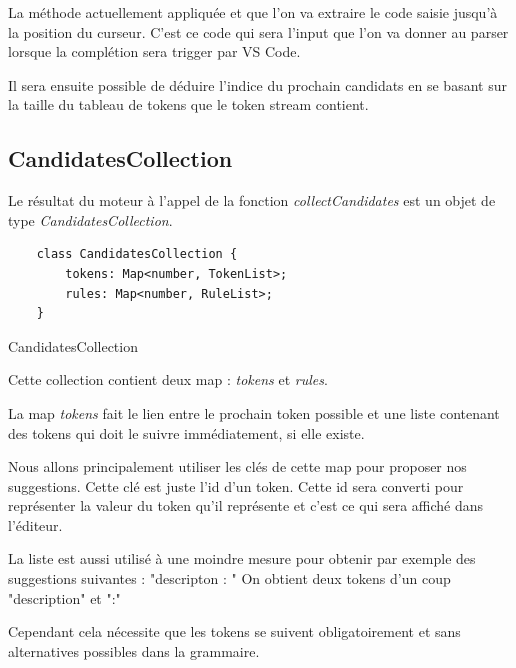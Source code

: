 \documentclass[
    iict, %
    il, %
]{heig-tb}
\begin{document}
La méthode actuellement appliquée et que l'on va extraire le code saisie jusqu'à la position du curseur.
C'est ce code qui sera l'input que l'on va donner au parser lorsque la complétion sera trigger par VS Code.

Il sera ensuite possible de déduire l'indice du prochain candidats en se basant sur la taille du tableau de tokens que le token stream contient.


\subsection{CandidatesCollection}

Le résultat du moteur à l'appel de la fonction \emph{collectCandidates} est un objet de type \emph{CandidatesCollection}.

\begin{listing}[!ht]
    \begin{verbatim}
    class CandidatesCollection {
        tokens: Map<number, TokenList>;
        rules: Map<number, RuleList>;
    }
    \end{verbatim}
    \caption{CandidatesCollection}
    \label{CandidatesCollection}
\end{listing}

Cette collection contient deux map : \emph{tokens} et \emph{rules}.

La map \emph{tokens} fait le lien entre le prochain token possible et une liste contenant des tokens qui doit le suivre immédiatement, si elle existe.

Nous allons principalement utiliser les clés de cette map pour proposer nos suggestions.
Cette clé est juste l'id d'un token. Cette id sera converti pour représenter la valeur du token qu'il représente et c'est ce qui sera affiché dans l'éditeur.

La liste est aussi utilisé à une moindre mesure pour obtenir par exemple des suggestions suivantes : "descripton : "
On obtient deux tokens d'un coup "description" et ":"

Cependant cela nécessite que les tokens se suivent obligatoirement et sans alternatives possibles dans la grammaire.
\end{document}

